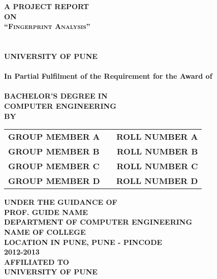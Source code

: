 \newpage
\begin{center}
\thispagestyle{empty}
\Large{\textbf{A PROJECT REPORT\\ \large{ON}}}\\[0.7cm]
\LARGE{\textsc {\textbf{``Fingerprint Analysis''}}}\\[0.5cm]
\vspace{0.5cm}
\Large{\textbf{\\}}
\LARGE{\textbf{\\UNIVERSITY OF PUNE\\}}
\vspace{1cm}
\Large{\textbf{\\In Partial Fulfilment of the Requirement for the Award of\\}}
\Large{\textbf{\\BACHELOR'S DEGREE IN\\COMPUTER ENGINEERING}}
\vspace{1cm}
\Large{\textbf{\\BY}}\\[0.5cm]
\begin{table}[h]
\centering
\Large{
\begin{tabular}{>{\bfseries}lc>{\bfseries}r}
GROUP MEMBER A & & ROLL NUMBER A\\GROUP MEMBER B & & ROLL NUMBER B\\GROUP MEMBER C & & ROLL NUMBER C\\GROUP MEMBER D & & ROLL NUMBER D\\
\end{tabular}}
\end{table}
\vspace{0.5cm}
\large{\textbf{UNDER THE GUIDANCE OF}}\\
\large{\textbf{PROF. GUIDE NAME}}\\
\vspace{1cm}
\large{\textbf{DEPARTMENT OF COMPUTER ENGINEERING}}\\
\Large{\textbf{NAME OF COLLEGE}}\\
\large{\textbf{LOCATION IN PUNE, PUNE - PINCODE}}
\large{\textbf{\\2012-2013}}\\
\vspace{1cm}
\Large{\textbf{AFFILIATED TO\\}}
\LARGE{\textbf{UNIVERSITY OF PUNE}}
\newpage
\end{center}